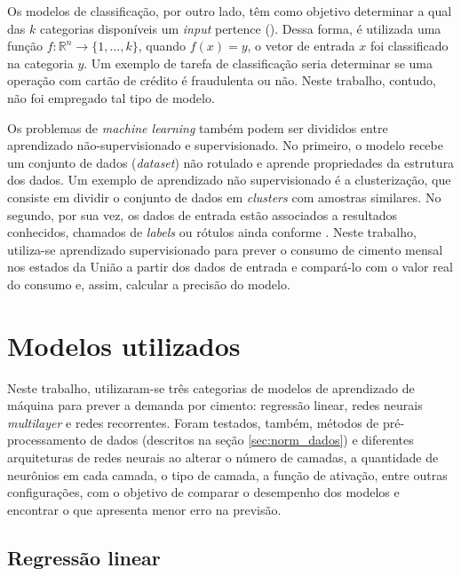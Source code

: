 Os modelos de classificação, por outro lado, têm como objetivo 
determinar a qual das $k$ categorias disponíveis um 
\textit{input} pertence (\cite{dl-oreilly}). Dessa forma, é utilizada uma função  
$ f : \mathbb{R}^n \rightarrow \{1,...,k\}$, quando 
$ f(x) = y$, o vetor de entrada $x$ foi classificado 
na categoria $y$. Um exemplo de tarefa de classificação
seria determinar se uma operação com cartão de crédito 
é fraudulenta ou não. Neste trabalho, contudo, não foi empregado 
tal tipo de modelo. 

Os problemas de 
\textit{machine learning} também podem ser divididos entre
aprendizado não-supervisionado e supervisionado. No primeiro, 
o modelo recebe um conjunto de dados (\textit{dataset}) não 
rotulado e aprende propriedades da estrutura dos dados. 
Um exemplo de aprendizado não supervisionado é a clusterização,
que consiste em dividir o conjunto de dados
em \textit{clusters} com amostras similares. No segundo, por sua vez, 
os dados de entrada estão associados a resultados conhecidos, 
chamados de \textit{labels} ou rótulos ainda conforme \citet{Goodfellow-et-al-2016}. Neste trabalho, utiliza-se aprendizado 
supervisionado para prever o consumo de cimento mensal nos 
estados da União a partir dos dados de entrada e compará-lo 
com o valor real 
do consumo e, assim, calcular a precisão do modelo.

\section{Modelos utilizados}

Neste trabalho, utilizaram-se três categorias de modelos de aprendizado 
de máquina para prever a demanda por cimento: regressão linear, redes
neurais \textit{multilayer} e redes recorrentes. Foram testados, também,
 métodos de pré-processamento de dados (descritos na seção \ref{sec:norm_dados}) e  diferentes arquiteturas de 
redes neurais ao alterar o número de camadas, a quantidade de neurônios
em cada camada, o tipo de camada, a função de ativação, entre outras
configurações, com o objetivo de comparar 
o desempenho dos modelos e encontrar o que apresenta menor erro na previsão.

\subsection{Regressão linear}
\label{sec:reg_lin}

